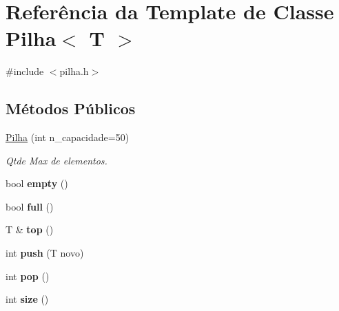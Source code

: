 \hypertarget{classPilha}{}\section{Referência da Template de Classe Pilha$<$ T $>$}
\label{classPilha}


{\ttfamily \#include $<$pilha.\+h$>$}

\subsection*{Métodos Públicos}
\begin{DoxyCompactItemize}
\item 
\hyperlink{classPilha_a3113638095289f155d7c76db4b2da3df}{Pilha} (int n\+\_\+capacidade=50)\hypertarget{classPilha_a3113638095289f155d7c76db4b2da3df}{}\label{classPilha_a3113638095289f155d7c76db4b2da3df}

\begin{DoxyCompactList}\small\item\em Qtde Max de elementos. \end{DoxyCompactList}\item 
bool {\bfseries empty} ()\hypertarget{classPilha_a117c819eb1bff51136b7c72b486df0fc}{}\label{classPilha_a117c819eb1bff51136b7c72b486df0fc}

\item 
bool {\bfseries full} ()\hypertarget{classPilha_ae9204010a17accede9ebd6e92c084c15}{}\label{classPilha_ae9204010a17accede9ebd6e92c084c15}

\item 
T \& {\bfseries top} ()\hypertarget{classPilha_adb80016e40c990aa1074f879b1ef7b89}{}\label{classPilha_adb80016e40c990aa1074f879b1ef7b89}

\item 
int {\bfseries push} (T novo)\hypertarget{classPilha_a3f80cb860cfa58f459d7f484c9045879}{}\label{classPilha_a3f80cb860cfa58f459d7f484c9045879}

\item 
int {\bfseries pop} ()\hypertarget{classPilha_a720f99ec51a9d2e3ae2e59ab78365b84}{}\label{classPilha_a720f99ec51a9d2e3ae2e59ab78365b84}

\item 
int {\bfseries size} ()\hypertarget{classPilha_aae0f3f465788cefc53f9cadadc0e1fe0}{}\label{classPilha_aae0f3f465788cefc53f9cadadc0e1fe0}

\end{DoxyCompactItemize}
